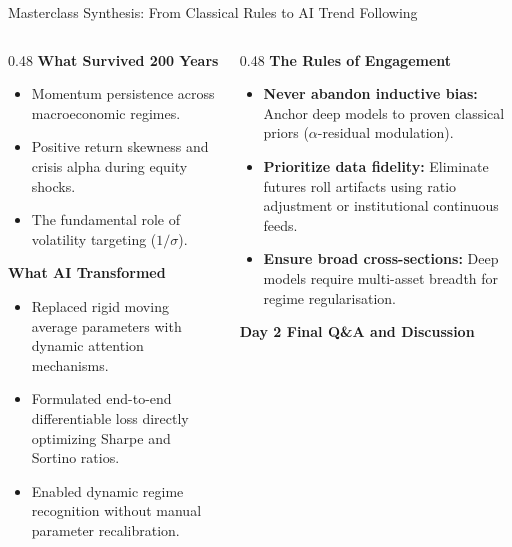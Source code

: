\documentclass[10pt]{beamer}
\begin{document}
\begin{frame}{Masterclass Synthesis: From Classical Rules to AI Trend Following}
  \begin{columns}[t]
    \begin{column}{0.48\textwidth}
      \textbf{What Survived 200 Years}
      \begin{itemize}\scriptsize
        \item Momentum persistence across macroeconomic regimes.
        \item Positive return skewness and crisis alpha during equity shocks.
        \item The fundamental role of volatility targeting ($1/\sigma$).
      \end{itemize}
      \textbf{What AI Transformed}
      \begin{itemize}\scriptsize
        \item Replaced rigid moving average parameters with dynamic attention mechanisms.
        \item Formulated end-to-end differentiable loss directly optimizing Sharpe and Sortino ratios.
        \item Enabled dynamic regime recognition without manual parameter recalibration.
      \end{itemize}
    \end{column}
    \begin{column}{0.48\textwidth}
      \textbf{The Rules of Engagement}
      \begin{itemize}\scriptsize
        \item \textbf{Never abandon inductive bias:} Anchor deep models to proven classical priors ($\alpha$-residual modulation).
        \item \textbf{Prioritize data fidelity:} Eliminate futures roll artifacts using ratio adjustment or institutional continuous feeds.
        \item \textbf{Ensure broad cross-sections:} Deep models require multi-asset breadth for regime regularisation.
      \end{itemize}
      \vspace{0.1cm}
      \begin{center}
        \textbf{Day 2 Final Q\&A and Discussion}
      \end{center}
    \end{column}
  \end{columns}
\end{frame}
\end{document}
